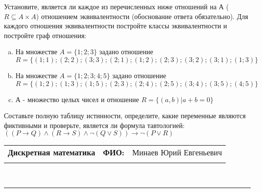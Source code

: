 \documentclass[10pt]{exam}
\newcommand{\class}{Дискретная математика}
\newcommand{\examdate}{}
\begin{document}
\begin{questions}
\question
Установите, является ли каждое из перечисленных ниже отношений на А ($R \subseteq A \times A$) отношением эквивалентности (обоснование ответа обязательно). Для каждого отношения эквивалентности постройте классы 
эквивалентности и постройте граф отношения:
\begin{enumerate} [a)]\setcounter{enumi}{0}
\item На множестве $A = \{1; 2; 3\}$ задано отношение $R = \{(1; 1); (2; 2); (3; 3); (2; 1); (1; 2); (2; 3); (3; 2); (3; 1); (1; 3)\}$
\item На множестве $A = \{1; 2; 3; 4; 5\}$ задано отношение $R = \{(1; 2); (1; 3); (1; 5); (2; 3); (2; 4); (2; 5); (3; 4); (3; 5); (4; 5)\}$
\item А - множество целых чисел и отношение $R = \{(a,b)|a + b = 0\}$
\end{enumerate}\question Составьте полную таблицу истинности, определите, какие переменные являются фиктивными и проверьте, является ли формула тавтологией:
$((P \rightarrow Q) \land (R \rightarrow S) \land \neg (Q \lor S)) \rightarrow \neg (P \lor R)$

\end{questions}
\newpage
\begin{flushright}
\begin{tabular}{p{2.8in} r l}
\textbf{\class} & \textbf{ФИО:} &Минаев Юрий Евгеньевич
\\

\textbf{\examdate} &&\\
\end{tabular}\\
\end{flushright}
\rule[1ex]{\textwidth}{.1pt}
\end{document}
